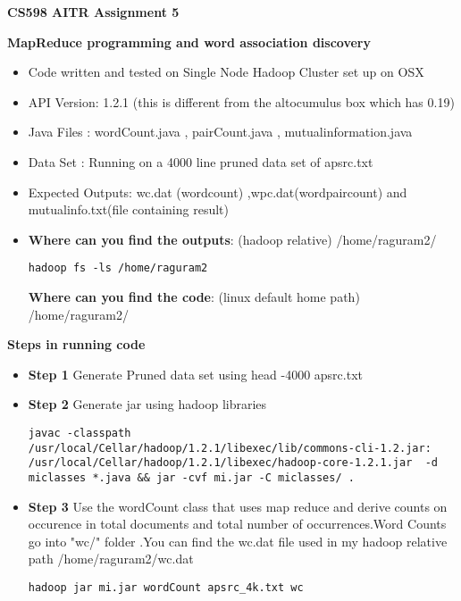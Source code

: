 \documentclass[12pt]{article}
\theoremstyle{definition}
\begin{document}
\centerline {{\bf CS598 AITR Assignment 5 }}
\begin{solution}
 {\bf MapReduce programming and word association discovery } \\
\begin{itemize}

\item Code written and tested on Single Node Hadoop Cluster set up on OSX
\item API Version: 1.2.1  (this is different from the altocumulus box which has 0.19)
\item Java Files : wordCount.java , pairCount.java , mutualinformation.java

\item Data Set	: Running on a 4000 line pruned data set of apsrc.txt

\item Expected Outputs: wc.dat (wordcount) ,wpc.dat(wordpaircount) and mutualinfo.txt(file containing result)

\item {\bf Where can you find the outputs}: (hadoop relative) /home/raguram2/
\begin{verbatim}
hadoop fs -ls /home/raguram2
\end{verbatim}

{\bf Where can you find the code}: (linux default home path) /home/raguram2/
\end{itemize}

{ \bf Steps in running code}
\begin{itemize}
\item {\bf Step 1}
\newline Generate Pruned data set using head -4000  apsrc.txt 
\item {\bf Step 2}
\newline Generate jar using hadoop libraries  
\begin{verbatim}
javac -classpath /usr/local/Cellar/hadoop/1.2.1/libexec/lib/commons-cli-1.2.jar:
/usr/local/Cellar/hadoop/1.2.1/libexec/hadoop-core-1.2.1.jar  -d 
miclasses *.java && jar -cvf mi.jar -C miclasses/ .
\end{verbatim}
\item {\bf Step 3}
\newline Use the wordCount class that uses map reduce and derive counts on occurence in total documents and total number of occurrences.Word Counts go into "wc/" folder .You can find the wc.dat file used in my hadoop relative path /home/raguram2/wc.dat
\begin{verbatim}
hadoop jar mi.jar wordCount apsrc_4k.txt wc
\end{verbatim}


\end{itemize}
\end{solution}
\end{document}
